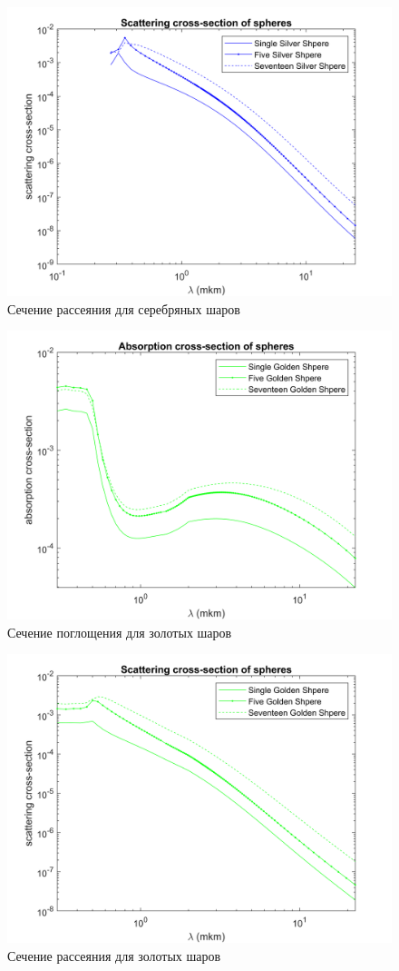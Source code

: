 \begin{figure}[h!]
	\centering
	\includegraphics[width=0.8\linewidth]{scatForSilver}
	\caption{Сечение рассеяния для серебряных шаров}
	\label{fig:scatForSilver}
\end{figure} 
\begin{figure}[h!]
	\centering
	\includegraphics[width=0.8\linewidth]{absorpForGold}
	\caption{Сечение поглощения для золотых шаров}
	\label{fig:absorpForGold}
\end{figure}
\begin{figure}[h!]
	\centering
	\includegraphics[width=0.8\linewidth]{scatForGold}
	\caption{Сечение рассеяния для золотых шаров}
	\label{fig:scatForGold}
\end{figure} 